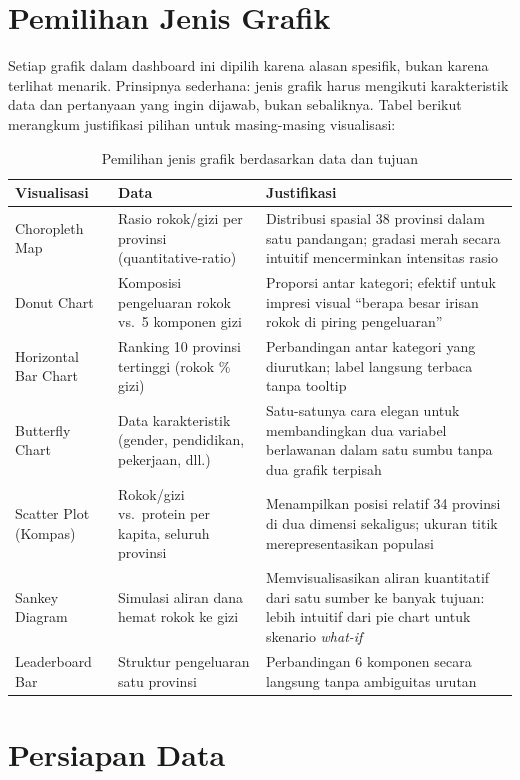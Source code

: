 \section{Pemilihan Jenis Grafik}

Setiap grafik dalam dashboard ini dipilih karena alasan spesifik, bukan karena terlihat menarik. Prinsipnya sederhana: jenis grafik harus mengikuti karakteristik data dan pertanyaan yang ingin dijawab, bukan sebaliknya. Tabel berikut merangkum justifikasi pilihan untuk masing-masing visualisasi:

\begin{table}[H]
\centering
\caption{Pemilihan jenis grafik berdasarkan data dan tujuan}
\renewcommand{\arraystretch}{1.3}
\begin{tabularx}{\textwidth}{@{}lXX@{}}
\toprule
\textbf{Visualisasi} & \textbf{Data} & \textbf{Justifikasi} \\
\midrule
Choropleth Map & Rasio rokok/gizi per provinsi (quantitative-ratio) & Distribusi spasial 38 provinsi dalam satu pandangan; gradasi merah secara intuitif mencerminkan intensitas rasio \\
Donut Chart & Komposisi pengeluaran rokok vs.\ 5 komponen gizi & Proporsi antar kategori; efektif untuk impresi visual ``berapa besar irisan rokok di piring pengeluaran'' \\
Horizontal Bar Chart & Ranking 10 provinsi tertinggi (rokok \% gizi) & Perbandingan antar kategori yang diurutkan; label langsung terbaca tanpa tooltip \\
Butterfly Chart & Data karakteristik (gender, pendidikan, pekerjaan, dll.) & Satu-satunya cara elegan untuk membandingkan dua variabel berlawanan dalam satu sumbu tanpa dua grafik terpisah \\
Scatter Plot (Kompas) & Rokok/gizi vs.\ protein per kapita, seluruh provinsi & Menampilkan posisi relatif 34 provinsi di dua dimensi sekaligus; ukuran titik merepresentasikan populasi \\
Sankey Diagram & Simulasi aliran dana hemat rokok ke gizi & Memvisualisasikan aliran kuantitatif dari satu sumber ke banyak tujuan: lebih intuitif dari pie chart untuk skenario \textit{what-if} \\
Leaderboard Bar & Struktur pengeluaran satu provinsi & Perbandingan 6 komponen secara langsung tanpa ambiguitas urutan \\
\bottomrule
\end{tabularx}
\end{table}

\section{Persiapan Data}

